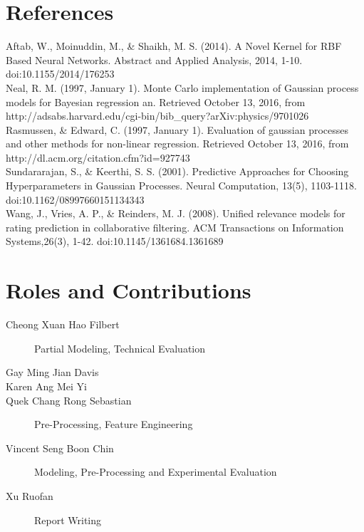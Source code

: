 \documentclass[letterpaper]{article}
\begin{document}
\section{References}

Aftab, W., Moinuddin, M., \& Shaikh, M. S. (2014). A Novel Kernel for RBF Based Neural Networks. Abstract and Applied Analysis, 2014, 1-10. doi:10.1155/2014/176253\\

Neal, R. M. (1997, January 1). Monte Carlo implementation of Gaussian process models for Bayesian regression an. Retrieved October 13, 2016, from http://adsabs.harvard.edu/cgi-bin/bib\_query?arXiv:physics/9701026\\

Rasmussen, \& Edward, C. (1997, January 1). Evaluation of gaussian processes and other methods for non-linear regression. Retrieved October 13, 2016, from http://dl.acm.org/citation.cfm?id=927743\\


Sundararajan, S., \& Keerthi, S. S. (2001). Predictive Approaches for Choosing Hyperparameters in Gaussian Processes. Neural Computation, 13(5), 1103-1118. doi:10.1162/08997660151134343\\

Wang, J., Vries, A. P., \& Reinders, M. J. (2008). Unified relevance models for rating prediction in collaborative filtering. ACM Transactions on Information Systems,26(3), 1-42. doi:10.1145/1361684.1361689\\

\section{Roles and Contributions}


\begin{description}
\item [Cheong Xuan Hao Filbert] Partial Modeling, Technical Evaluation
\item [Gay Ming Jian Davis]
\item [Karen Ang Mei Yi]
\item [Quek Chang Rong Sebastian] Pre-Processing, Feature Engineering
\item [Vincent Seng Boon Chin] Modeling, Pre-Processing and Experimental Evaluation
\item [Xu Ruofan] Report Writing
\end{description}
\end{document}
